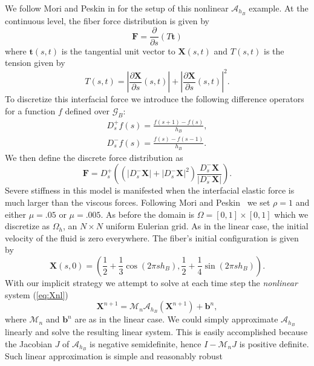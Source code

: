 \documentclass[preprint,12pt]{elsarticle}
\begin{document}
We follow Mori and Peskin in \cite{MP2008} for the setup of this nonlinear $\mathcal{A}_{h_B}$  example. At the continuous level,  the fiber force distribution is given by
\begin{equation}
\mathbf{F} = \frac{\partial}{\partial s} (T\mathbf{t})
\end{equation}
where $\mathbf{t}(s,t)$ is the tangential unit vector to $\mathbf{X}(s,t)$ and $T(s,t)$ is the tension given by
\begin{equation}
T(s,t) = \left| \frac{\partial\mathbf{X}}{\partial s}(s,t) \right|
 +     \left| \frac{\partial\mathbf{X}}{\partial s}(s,t) \right|^2.
\end{equation}
To discretize this interfacial force we introduce the following difference operators for  a function $f$ defined over $\mathcal{G}_B$:
\begin{eqnarray}
D_s^+f(s) = \frac{f(s+1)-f(s)}{h_B},\\
D_s^-f(s) = \frac{f(s)-f(s-1)}{h_B}.
\end{eqnarray}
We then define the discrete force distribution as
\begin{equation}
\mathbf{F} = D_s^+ \left(\left(
\left| D_s^-\mathbf{X} \right| +
\left| D_s^-\mathbf{X} \right|^2 \right)
\frac{ D_s^-\mathbf{X} }{ \left| D_s^-\mathbf{X} \right| } \right).
\end{equation}
Severe stiffness in this model is manifested when the interfacial elastic force is much larger than the viscous forces. Following
Mori and Peskin~\cite{MP2008} we set $\rho = 1$ and either $\mu = .05$ or $\mu = .005$. As before the domain is $\Omega = [0,1]\times[0,1]$ which we discretize as $\Omega_h$, an $N\times N$ uniform Eulerian grid. As in the linear case, the initial velocity of the fluid is zero everywhere. The fiber's initial configuration is given by
\begin{equation}
\mathbf{X}(s,0) = (\frac{1}{2} + \frac{1}{3}\cos(2\pi sh_B), \frac{1}{2} + \frac{1}{4}\sin(2\pi sh_B)).
\end{equation}
With our implicit strategy we attempt to solve at each time step the {\em nonlinear} system (\ref{eq:Xnl})
$$
\mathbf{X}^{n+1} = \mathcal{M}_n\mathcal{A}_{h_B} (\mathbf{X}^{n+1}) + \mathbf{b}^n,
$$
where $\mathcal{M}_n$ and $\mathbf{b}^n$ are as in the linear case. We could simply approximate $\mathcal{A}_{h_B}$ linearly and solve the resulting linear system. This is easily accomplished because the Jacobian $J$ of $\mathcal{A}_{h_B}$ is negative semidefinite, hence  $I-\mathcal{M}_nJ$ is positive definite. Such linear approximation is simple and reasonably robust
\end{document}
